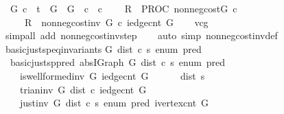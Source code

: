 \begin{isabellebody}
\ \ {\isachardoublequoteopen}{\isasymforall}G\ c{\isachardot}\ {\isasymGamma}\ {\isasymturnstile}\isactrlsub t\ {\isasymlbrace}\ {\isasymacute}G\ {\isacharequal}\ G\ {\isasymand}\ {\isasymacute}c\ {\isacharequal}\ c{\isasymrbrace}\isanewline
\ \ \ \ {\isasymacute}R\ {\isacharcolon}{\isacharequal}{\isacharequal}\ PROC\ non{\isacharunderscore}neg{\isacharunderscore}cost{\isacharparenleft}{\isasymacute}G{\isacharcomma}\ {\isasymacute}c{\isacharparenright}\isanewline
\ \ \ \ {\isasymlbrace}\ {\isasymacute}R\ {\isacharequal}\ non{\isacharunderscore}neg{\isacharunderscore}cost{\isacharunderscore}inv\ G\ c\ {\isacharparenleft}iedge{\isacharunderscore}cnt\ G{\isacharparenright}{\isasymrbrace}{\isachardoublequoteclose}\isanewline
%
\isadelimproof
\ \ %
\endisadelimproof
%
\isatagproof
{}\isamarkupfalse%
\ vcg\isanewline
\ \ \isamarkupfalse%
\ {\isacharparenleft}simp{\isacharunderscore}all\ add{\isacharcolon}\ non{\isacharunderscore}neg{\isacharunderscore}cost{\isacharunderscore}inv{\isacharunderscore}step{\isacharparenright}\isanewline
\ \ \isamarkupfalse%
\ {\isacharparenleft}auto\ simp{\isacharcolon}\ non{\isacharunderscore}neg{\isacharunderscore}cost{\isacharunderscore}inv{\isacharunderscore}def{\isacharparenright}\isanewline
{}\isamarkupfalse%
%
\endisatagproof
{\isafoldproof}%
%
\isadelimproof
\isanewline
%
\endisadelimproof
\isanewline
{}\isamarkupfalse%
\ basic{\isacharunderscore}just{\isacharunderscore}sp{\isacharunderscore}eq{\isacharunderscore}invariants{\isacharcolon}\isanewline
{\isachardoublequoteopen}{\isasymAnd}G\ dist\ c\ s\ enum\ pred{\isachardot}\ \isanewline
\ \ basic{\isacharunderscore}just{\isacharunderscore}sp{\isacharunderscore}pred\ {\isacharparenleft}abs{\isacharunderscore}IGraph\ G{\isacharparenright}\ dist\ c\ s\ enum\ pred\ {\isasymlongleftrightarrow}\ \isanewline
\ \ \ \ {\isacharparenleft}is{\isacharunderscore}wellformed{\isacharunderscore}inv\ G\ {\isacharparenleft}iedge{\isacharunderscore}cnt\ G{\isacharparenright}\ {\isasymand}\ \isanewline
\ \ \ \ dist\ s\ {\isasymle}\ {}\ {\isasymand}\ \isanewline
\ \ \ \ trian{\isacharunderscore}inv\ G\ dist\ c\ {\isacharparenleft}iedge{\isacharunderscore}cnt\ G{\isacharparenright}\ {\isasymand}\ \isanewline
\ \ \ \ just{\isacharunderscore}inv\ G\ dist\ c\ s\ enum\ pred\ {\isacharparenleft}ivertex{\isacharunderscore}cnt\ G{\isacharparenright}{\isacharparenright}{\isachardoublequoteclose}\isanewline
%
\isadelimproof
%
\endisadelimproof
%
\isatagproof
{}\isamarkupfalse%
\ {\isacharminus}\isanewline

\end{isabellebody}
